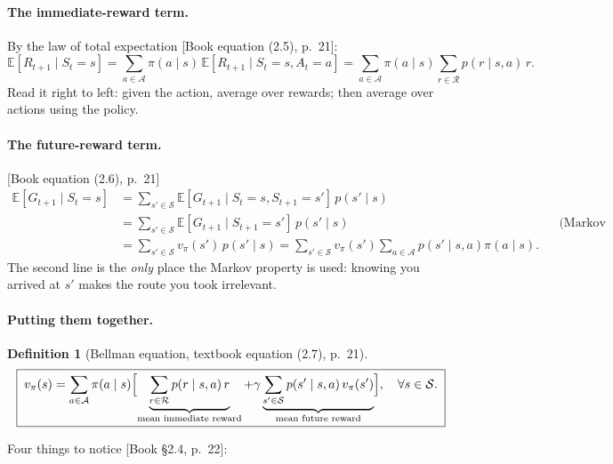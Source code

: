 \documentclass[11pt, letterpaper]{article}
\theoremstyle{runin}
\newtheorem*{definition}{Definition}
\theoremstyle{runinplain}
\theoremstyle{remark}
\newcommand{\E}{\mathbb{E}}
\newcommand{\Sspace}{\mathcal{S}}
\newcommand{\Aspace}{\mathcal{A}}
\newcommand{\bkin}[1]{{\color{bookblue}\small[\textsf{Book #1}]}}
\begin{document}
\paragraph{The immediate-reward term.} By the law of total expectation
\bkin{equation (2.5), p.~21}:
\[
  \E[R_{t+1}\mid S_t=s]
  =\sum_{a\in\Aspace}\pi(a\mid s)\,\E[R_{t+1}\mid S_t=s,A_t=a]
  =\sum_{a\in\Aspace}\pi(a\mid s)\sum_{r\in\mathcal R}p(r\mid s,a)\,r.
\]
Read it right to left: given the action, average over rewards; then average over
actions using the policy.

\paragraph{The future-reward term.} \bkin{equation (2.6), p.~21}
\[
\begin{aligned}
  \E[G_{t+1}\mid S_t=s]
  &=\sum_{s'\in\Sspace}\E[G_{t+1}\mid S_t=s,S_{t+1}=s']\,p(s'\mid s)\\
  &=\sum_{s'\in\Sspace}\E[G_{t+1}\mid S_{t+1}=s']\,p(s'\mid s)
    &&\text{(Markov property)}\\
  &=\sum_{s'\in\Sspace}v_\pi(s')\,p(s'\mid s)
   =\sum_{s'\in\Sspace}v_\pi(s')\sum_{a\in\Aspace}p(s'\mid s,a)\pi(a\mid s).
\end{aligned}
\]
The second line is the \emph{only} place the Markov property is used: knowing you
arrived at $s'$ makes the route you took irrelevant.

\paragraph{Putting them together.}

\begin{definition}[Bellman equation, textbook equation (2.7), p.~21]
\[
  \boxed{\;
  v_\pi(s)=\sum_{a\in\Aspace}\pi(a\mid s)
  \Bigl[\underbrace{\sum_{r\in\mathcal R}p(r\mid s,a)\,r}_{\text{mean immediate reward}}
       +\gamma\underbrace{\sum_{s'\in\Sspace}p(s'\mid s,a)\,v_\pi(s')}_{\text{mean future reward}}\Bigr],
  \quad \forall s\in\Sspace. \;}
\]
\end{definition}

Four things to notice \bkin{\S2.4, p.~22}:
\end{document}
